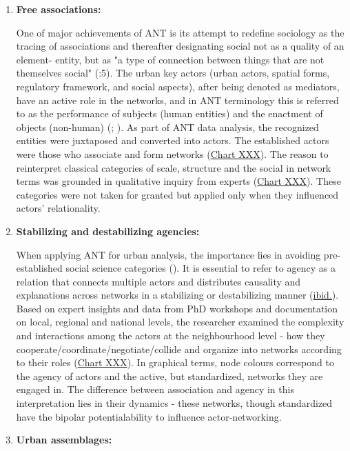 \documentclass[11pt]{report}
\begin{document}
{{{{\begin{enumerate}
\item \textbf{Free associations:}

One of major achievements of ANT is its attempt to redefine sociology as the tracing of associations and thereafter designating social not as a quality of an element- entity, but as "a type of connection between things that are not themselves social"  (\href{Latour}{\citealt{latour_science_2005}}:5).
The urban key actors (urban actors, spatial forms, regulatory framework, and social aspects), after being denoted as mediators, have an active role in the networks, and in ANT terminology this is referred to as the performance of subjects (human entities) and the enactment of objects (non-human) (\href{Callon}{\citealt{callon_elements_1986}}; \href{Farias}{\citealt{farias_introduction:_2011}}). As part of ANT data analysis, the recognized entities were juxtaposed and converted into actors.  The established actors were those who associate and form networks (\href{Table ANT discource analysos}{Chart XXX}). The reason to reinterpret classical categories of scale, structure and the social in network terms was grounded in qualitative inquiry from experts (\href{Table data sources}{Chart XXX}). These categories were not taken for granted but applied only when they influenced actors’ relationality.

\item \textbf{Stabilizing and destabilizing agencies:}

When applying ANT for urban analysis, the importance lies in avoiding pre-established social science categories (\href{Farias}{\citealt{farias_introduction:_2011}}). It is essential to refer to agency as a relation that connects multiple actors and distributes causality and explanations across networks in a stabilizing or destabilizing manner  (\href{ref}{ibid.}). 
Based on expert insights and data from PhD workshops and documentation on local, regional and national levels, the researcher examined the complexity and interactions among the actors at the neighbourhood level - how they cooperate/coordinate/negotiate/collide and organize into networks according to their roles (\href{Table ANT discource analysos}{Chart XXX}). In graphical terms, node colours correspond to the agency of actors and the active, but standardized, networks they are engaged in. The difference between association and agency in this interpretation lies in their dynamics - these networks, though standardized have the bipolar potentialability to influence actor-networking.

\item \textbf{Urban assemblages:}


\end{enumerate}}}}}
\end{document}
